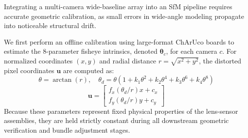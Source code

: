 \documentclass[letterpaper, 10 pt, conference]{ieeeconf}  %
\begin{document}

Integrating a multi-camera wide-baseline array into an SfM pipeline requires accurate geometric calibration, as small errors in wide-angle modeling propagate into noticeable structural drift. 

We first perform an offline calibration using large-format ChArUco boards to estimate the 8-parameter fisheye intrinsics, denoted $\boldsymbol{\theta}_c$, for each camera $c$. For normalized coordinates $(x,y)$ and radial distance $r = \sqrt{x^2+y^2}$, the distorted pixel coordinates $\mathbf{u}$ are computed as:
\begin{equation}
    \theta = \arctan(r),\quad \theta_d = \theta(1 + k_1\theta^2 + k_2\theta^4 + k_3\theta^6 + k_4\theta^8)
\end{equation}
\begin{equation}
    \mathbf{u} = \begin{bmatrix} f_x (\theta_d / r) x + c_x \\ f_y (\theta_d / r) y + c_y \end{bmatrix}
\end{equation}
Because these parameters represent fixed physical properties of the lens-sensor assemblies, they are held strictly constant during all downstream geometric verification and bundle adjustment stages.


\end{document}
